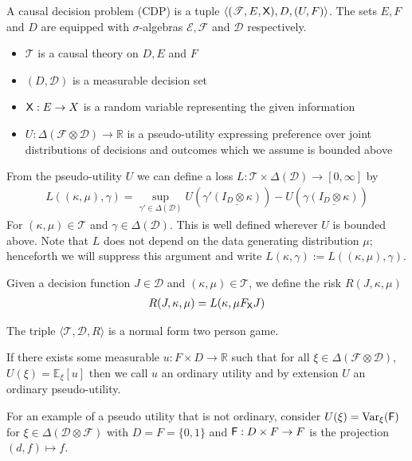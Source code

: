 \begin{definition}\label{def:CDP}
A causal decision problem (CDP) is a tuple $\langle (\mathscr{T}, E, \mathsf{X}), D, (U,F) \rangle$. The sets $E,F$ and $D$ are equipped with $\sigma$-algebras $\mathcal{E},\mathcal{F}$ and $\mathcal{D}$ respectively.

\begin{itemize}
    \item $\mathscr{T}$ is a causal theory on $D, E$ and $F$
    \item $(D,\mathcal{D})$ is a measurable decision set
    \item $\mathsf{X}:E\to X$ is a random variable representing the given information
    \item $U:\Delta(\mathcal{F}\otimes \mathcal{D})\to \mathbb{R}$ is a pseudo-utility expressing preference over joint distributions of decisions and outcomes which we assume is bounded above
\end{itemize}

From the pseudo-utility $U$ we can define a loss $L:\mathscr{T}\times\Delta(\mathcal{D})\to [0,\infty]$ by
\begin{align}
    L((\kappa,\mu),\gamma) = \sup_{\gamma'\in\Delta(\mathcal{D})} U(\gamma'\underline{(I_D\otimes \kappa)}) - U(\gamma\underline{(I_D\otimes \kappa)})\label{eq:canonical_loss}
\end{align}
For $(\kappa,\mu)\in \mathscr{T}$ and $\gamma\in \Delta(\mathcal{D})$. This is well defined wherever $U$ is bounded above. Note that $L$ does not depend on the data generating distribution $\mu$; henceforth we will suppress this argument and write $L(\kappa,\gamma):= L((\kappa,\mu),\gamma)$.

Given a decision function $J\in\mathscr{D}$ and $(\kappa,\mu)\in \mathscr{T}$, we define the risk $R(J,\kappa,\mu)$
\begin{align}
    R(J,\kappa,\mu) = L(\kappa,\mu F_{\mathsf{X}} J) 
\end{align}

The triple $\langle \mathscr{T}, \mathscr{D}, R\rangle$ is a normal form two person game.

If there exists some measurable $u:F\times D\to \mathbb{R}$ such that for all $\xi\in \Delta(\mathcal{F}\otimes\mathcal{D})$, $U(\xi)=\mathbb{E}_{\xi}[u]$ then we call $u$ an ordinary utility and by extension $U$ an ordinary pseudo-utility.

For an example of a pseudo utility that is not ordinary, consider $U(\xi) = \text{Var}_{\xi}(\mathsf{F})$ for $\xi\in\Delta(\mathcal{D}\otimes\mathcal{F})$ with $D=F=\{0,1\}$ and $\mathsf{F}:D\times F\to F$ is the projection $(d,f)\mapsto f$.


\end{definition}
